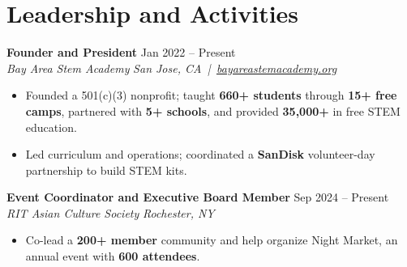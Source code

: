 \documentclass[10pt,letterpaper]{article}
\newif\ifresumeFirstRole
\newcommand{\resumeRole}[4]{%
  \ifresumeFirstRole
    \global\resumeFirstRolefalse
  \else
    \vspace{0pt plus 1fill}%
  \fi
  \textbf{#1} \hfill #2\\
  \textit{#3} \hfill \textit{#4}
}
\begin{document}
\section*{Leadership and Activities}
\resumeRole{Founder and President}{Jan 2022 -- Present}{Bay Area Stem Academy}{San Jose, CA \,|\, \href{https://bayareastemacademy.org}{bayareastemacademy.org}}
\begin{itemize}
  \item Founded a 501(c)(3) nonprofit; taught \textbf{660+ students} through \textbf{15+ free camps}, partnered with \textbf{5+ schools}, and provided \textbf{\textdollar{}35,000+} in free STEM education.
  \item Led curriculum and operations; coordinated a \textbf{SanDisk} volunteer-day partnership to build STEM kits.
\end{itemize}

\resumeRole{Event Coordinator and Executive Board Member}{Sep 2024 -- Present}{RIT Asian Culture Society}{Rochester, NY}
\begin{itemize}
  \item Co-lead a \textbf{200+ member} community and help organize Night Market, an annual event with \textbf{600 attendees}.
\end{itemize}
\end{document}
